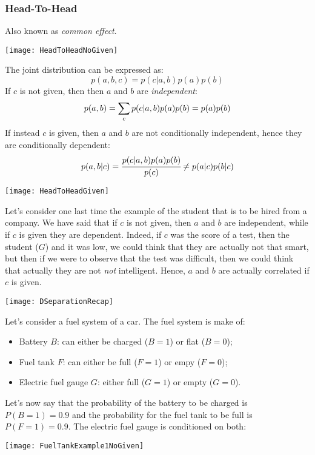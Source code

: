 \subsubsection{Head-To-Head}
Also known as \textit{common effect}.
\begin{center}
	\texttt{[image: HeadToHeadNoGiven]}  
\end{center}
The joint distribution can be expressed as:
\[
  p(a,b,c)=p(c\vert a, b)p(a)p(b)
\]
If $c$ is not given, then then $a$ and $b$ are \textit{independent}:
\[
  p(a,b)=\displaystyle\sum_cp(c\vert a, b)p(a)p(b)=p(a)p(b)
\]
If instead $c$ is given, then $a$ and $b$ are not conditionally independent, hence they are conditionally dependent:
\[
p(a,b\vert c)=\cfrac{p(c\vert a,b)p(a)p(b)}{p(c)}\neq p(a\vert c)p(b\vert c)
\]
\begin{center}
  \texttt{[image: HeadToHeadGiven]}
\end{center}
Let's consider one last time the example of the student that is to be hired from a company. We have said that if $c$ is not given, then $a$ and $b$ are independent, while if $c$ is given they are dependent. Indeed, if $c$ was the score of a test, then the student ($G$) and it was low, we could think that they are actually not that smart, but then if we were to observe that the test was difficult, then we could think that actually they are not \textit{not} intelligent. Hence, $a$ and $b$ are actually correlated if $c$ is given. 
\begin{center}
  \texttt{[image: DSeparationRecap]}
\end{center}
Let's consider a fuel system of a car. The fuel system is make of:
\begin{itemize}
  \item Battery $B$: can either be charged ($B=1$) or flat ($B=0$);
  \item Fuel tank $F$: can either be full ($F=1$) or empy ($F=0$);
  \item Electric fuel gauge $G$: either full ($G=1$) or empty ($G=0$).
\end{itemize}
Let's now say that the probability of the battery to be charged is $P(B=1)=0.9$ and the probability for the fuel tank to be full is $P(F=1)=0.9$. \newline
The electric fuel gauge is conditioned on both:
\begin{center}
  \texttt{[image: FuelTankExample1NoGiven]}
\end{center}
